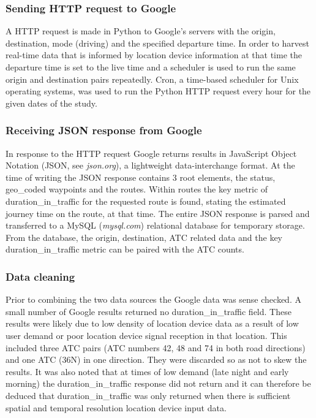 \documentclass{CUP-JNL-DCE}
\begin{document}
\subsubsection{Sending HTTP request to Google}

A HTTP request is made in Python to Google's servers with the origin, destination, mode (driving) and the specified departure time. In order to harvest real-time data that is informed by location device information at that time the departure time is set to the live time and a scheduler is used to run the same origin and destination pairs repeatedly. Cron, a time-based scheduler for Unix operating systems, was used to run the Python HTTP request every hour for the given dates of the study. 

\subsubsection{Receiving JSON response from Google}

In response to the HTTP request Google returns results in JavaScript Object Notation (JSON, see \textit{json.org}), a lightweight data-interchange format. At the time of writing the JSON response contains 3 root elements, the status, geo\_coded waypoints and the routes. Within routes the key metric of duration\_in\_traffic for the requested route is found, stating the estimated journey time on the route, at that time. The entire JSON response is parsed and transferred to a MySQL (\textit{mysql.com}) relational database for temporary storage. From the database, the origin, destination, ATC related data and the key duration\_in\_traffic metric can be paired with the ATC counts.

\subsubsection{Data cleaning}

Prior to combining the two data sources the Google data was sense checked. A small number of Google results returned no duration\_in\_traffic field. These results were likely due to low density of location device data as a result of low user demand or poor location device signal reception in that location. This included three ATC pairs (ATC numbers 42, 48 and 74 in both road directions) and one ATC (36N) in one direction. They were discarded so as not to skew the results. It was also noted that at times of low demand (late night and early morning) the duration\_in\_traffic response did not return and it can therefore be deduced that duration\_in\_traffic was only returned when there is sufficient spatial and temporal resolution location device input data. 
\end{document}
